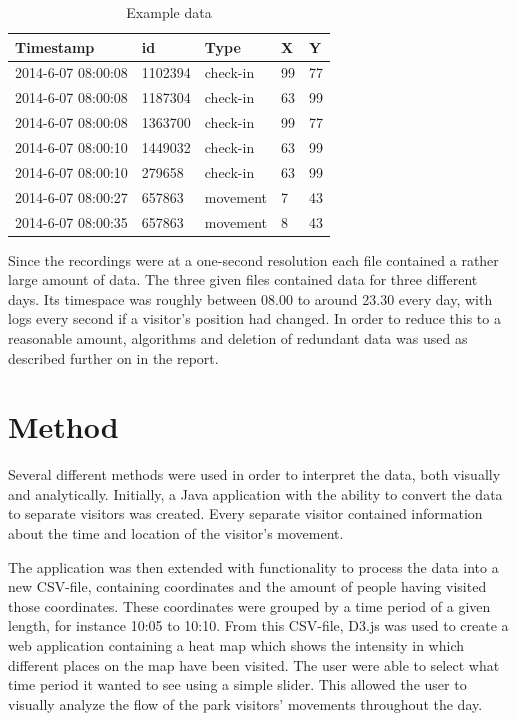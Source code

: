 \documentclass[journal]{vgtc}                %
\begin{document}
\begin{table}[h!]
\centering
\caption{Example data}
\label{dataexample}
\begin{tabular}{|l|l|l|l|l|}
\hline
\textbf{Timestamp} & \textbf{id} & \textbf{Type} & \textbf{X} & \textbf{Y} \\ \hline
2014-6-07 08:00:08 & 1102394     & check-in      & 99         & 77         \\ \hline
2014-6-07 08:00:08 & 1187304     & check-in      & 63         & 99         \\ \hline
2014-6-07 08:00:08 & 1363700     & check-in      & 99         & 77         \\ \hline
2014-6-07 08:00:10 & 1449032     & check-in      & 63         & 99         \\ \hline
2014-6-07 08:00:10 & 279658      & check-in      & 63         & 99         \\ \hline
2014-6-07 08:00:27 & 657863      & movement      & 7          & 43         \\ \hline
2014-6-07 08:00:35 & 657863      & movement      & 8          & 43         \\ \hline
\end{tabular}
\end{table}
Since the recordings were at a one-second resolution each file contained a rather large amount of data. The three given files contained data for three different days. Its timespace was roughly between 08.00 to around 23.30 every day, with logs every second if a visitor's position had changed. In order to reduce this to a reasonable amount, algorithms and deletion of redundant data was used as described further on in the report.


\section{Method}
Several different methods were used in order to interpret the data, both visually and analytically. Initially, a Java application with the ability to convert the data to separate visitors was created. Every separate visitor contained information about the time and location of the visitor's movement.

The application was then extended with functionality to process the data into a new CSV-file, containing coordinates and the amount of people having visited those coordinates. These coordinates were grouped by a time period of a given length, for instance 10:05 to 10:10. From this CSV-file, D3.js was used to create a web application containing a heat map which shows the intensity in which different places on the map have been visited. The user were able to select what time period it wanted to see using a simple slider. This allowed the user to visually analyze the flow of the park visitors' movements throughout the day.
\end{document}
